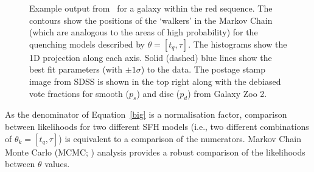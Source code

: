 \begin{figure}
\caption[Example \starpy ~output]{Example output from \starpy ~for a galaxy within the red sequence. The contours show the positions of the `walkers' in the Markov Chain (which are analogous to the areas of high probability) for the quenching models described by $\theta = [t_q, \tau]$. The histograms show the 1D projection along each axis. Solid (dashed) blue lines show the best fit parameters (with $\pm 1\sigma$) to the data. The postage stamp image from SDSS is shown in the top right along with the debiased vote fractions for smooth ($p_s$) and disc ($p_d$) from Galaxy Zoo 2.}
\label{one_example}
\end{figure}

As the denominator of Equation~\ref{big} is a normalisation factor, comparison between likelihoods for two different SFH models (i.e., two different combinations of $\theta_k = [t_q, \tau]$) is equivalent to a comparison of the numerators. Markov Chain Monte Carlo (MCMC; \citealt{mackay03, emcee13, GW10}) analysis provides a robust comparison of the likelihoods between $\theta$ values.

